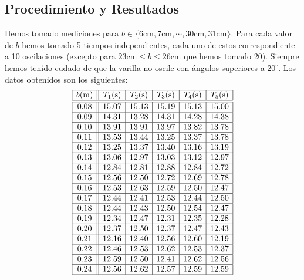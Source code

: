 \documentclass{article}
\begin{document}
\begin{multicols}{2}
\section{Procedimiento y Resultados}
Hemos tomado mediciones para $b\in \{6\text{cm}, 7\text{cm}, \cdots, 30\text{cm}, 31\text{cm}\}$. Para cada valor de $b$ hemos tomado 5 tiempos independientes, cada uno de estos correspondiente a 10 oscilaciones (excepto para $23 \text{cm}\le b \le 26\text{cm}$ que hemos tomado 20). Siempre hemos tenído cudado de que la varilla no oscile con ángulos superiores a $20^\circ$. Los datos obtenidos son los siguientes:
$$
    \begin{array}{|c||c|c|c|c|c|} \hline
        b\text{(m)} & T_1\text{(s)} & T_2\text{(s)} & T_3\text{(s)} & T_4\text{(s)} & T_5\text{(s)} \\ \hline\hline
        0.08 & 15.07 & 15.13 & 15.19 & 15.13 & 15.00  \\ \hline
        0.09 & 14.31 & 13.28 & 14.31 & 14.28 & 14.38  \\ \hline
        0.10 & 13.91 & 13.91 & 13.97 & 13.82 & 13.78  \\ \hline
        0.11 & 13.53 & 13.44 & 13.25 & 13.37 & 13.78  \\ \hline
        0.12 & 13.25 & 13.37 & 13.40 & 13.16 & 13.19  \\ \hline
        0.13 & 13.06 & 12.97 & 13.03 & 13.12 & 12.97  \\ \hline
        0.14 & 12.84 & 12.81 & 12.88 & 12.84 & 12.72  \\ \hline
        0.15 & 12.56 & 12.50 & 12.72 & 12.69 & 12.78  \\ \hline
        0.16 & 12.53 & 12.63 & 12.59 & 12.50 & 12.47  \\ \hline
        0.17 & 12.44 & 12.41 & 12.53 & 12.44 & 12.50  \\ \hline
        0.18 & 12.44 & 12.43 & 12.50 & 12.54 & 12.47  \\ \hline
        0.19 & 12.34 & 12.47 & 12.31 & 12.35 & 12.28  \\ \hline
        0.20 & 12.37 & 12.50 & 12.37 & 12.47 & 12.43  \\ \hline
        0.21 & 12.16 & 12.40 & 12.56 & 12.60 & 12.19  \\ \hline
        0.22 & 12.46 & 12.53 & 12.62 & 12.53 & 12.37  \\ \hline
        0.23 & 12.59 & 12.50 & 12.41 & 12.62 & 12.56  \\ \hline
        0.24 & 12.56 & 12.62 & 12.57 & 12.59 & 12.59  \\ \hline

\end{array}$$
\end{multicols}
\end{document}
